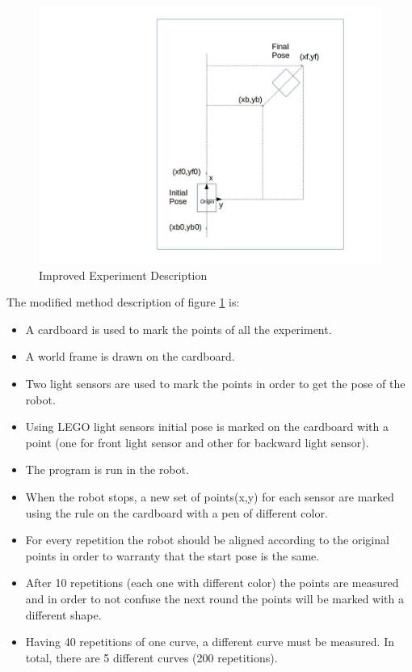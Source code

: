 \documentclass[10pt]{scrartcl}
\begin{document}
\begin{figure}[h!]
\centering
\includegraphics[trim=200 0 0 0, scale=0.35]{images/exp2}
\caption{Improved Experiment Description}
\label{fig:6}
\end{figure}

The modified method description of figure \ref{fig:6} is:
\begin{itemize}
	\item A cardboard is used to mark the points of all the experiment.
	\item A world frame is drawn on the cardboard.	
	\item Two light sensors are used to mark the points in order to get the pose of the robot.
	\item Using LEGO light sensors initial pose is marked on the cardboard with a point (one for front light sensor and other for backward light sensor).
	\item The program is run in the robot.
	\item When the robot stops, a new set of points(x,y) for each sensor are marked using the rule on the cardboard with a pen of different color.
	\item For every repetition the robot should be aligned according to the original points in order to warranty that the start pose is the same.
	\item After 10 repetitions (each one with different color) the points are measured and in order to not confuse the next round the points will be marked with a different shape.
	\item Having 40 repetitions of one curve, a different curve must be measured. In total, there are 5 different curves (200 repetitions).
\end{itemize}
\end{document}
